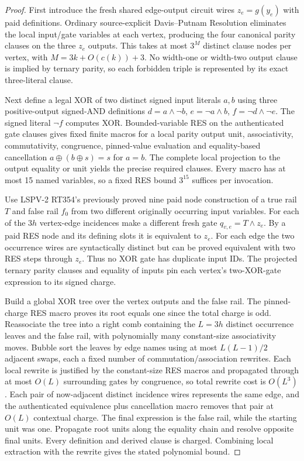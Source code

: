 \documentclass[11pt]{article}
\begin{document}
\begin{proof}
First introduce the fresh shared edge-output circuit wires $z_e=g(y_e)$ with paid definitions. Ordinary source-explicit Davis--Putnam Resolution eliminates the local input/gate variables at each vertex, producing the four canonical parity clauses on the three $z_e$ outputs. This takes at most $3^{M}$ distinct clause nodes per vertex, with $M=3k+O(c(k))+3$. No width-one or width-two output clause is implied by ternary parity, so each forbidden triple is represented by its exact three-literal clause.

Next define a legal XOR of two distinct signed input literals $a,b$ using three positive-output signed-AND definitions $d=a\wedge\neg b$, $e=\neg a\wedge b$, $f=\neg d\wedge\neg e$. The signed literal $\neg f$ computes XOR. Bounded-variable RES on the authenticated gate clauses gives fixed finite macros for a local parity output unit, associativity, commutativity, congruence, pinned-value evaluation and equality-based cancellation $a\oplus(b\oplus s)=s$ for $a=b$. The complete local projection to the output equality or unit yields the precise required clauses. Every macro has at most 15 named variables, so a fixed RES bound $3^{15}$ suffices per invocation.

Use LSPV-2 RT354's previously proved nine paid node construction of a true rail $T$ and false rail $f_0$ from two different originally occurring input variables. For each of the $3h$ vertex-edge incidences make a different fresh gate $q_{v,e}=T\wedge z_e$. By a paid RES node and its defining slots it is equivalent to $z_e$. For each edge the two occurrence wires are syntactically distinct but can be proved equivalent with two RES steps through $z_e$. Thus no XOR gate has duplicate input IDs. The projected ternary parity clauses and equality of inputs pin each vertex's two-XOR-gate expression to its signed charge.

Build a global XOR tree over the vertex outputs and the false rail. The pinned-charge RES macro proves its root equals one since the total charge is odd. Reassociate the tree into a right comb containing the $L=3h$ distinct occurrence leaves and the false rail, with polynomially many constant-size associativity moves. Bubble sort the leaves by edge names using at most $L(L-1)/2$ adjacent swaps, each a fixed number of commutation/association rewrites. Each local rewrite is justified by the constant-size RES macros and propagated through at most $O(L)$ surrounding gates by congruence, so total rewrite cost is $O(L^3)$. Each pair of now-adjacent distinct incidence wires represents the same edge, and the authenticated equivalence plus cancellation macro removes that pair at $O(L)$ contextual charge. The final expression is the false rail, while the starting unit was one. Propagate root units along the equality chain and resolve opposite final units. Every definition and derived clause is charged. Combining local extraction with the rewrite gives the stated polynomial bound.
\end{proof}
\end{document}
